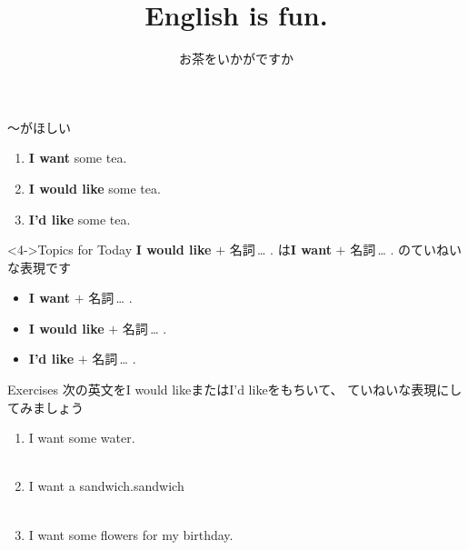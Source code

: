 \documentclass[aspectratio=169,xcolor={dvipsnames,table}]{beamer}
\title{English is fun.}
\subtitle{お茶をいかがですか}
\author{}
\institute[]{}
\date[]
\begin{document}
\begin{frame}[plain]
  \titlepage
\end{frame}


\begin{frame}[plain]{～がほしい}
\large
 \begin{enumerate}
  \item<1-> \textbf{I want} some tea.
  \item<2-> \textbf{I would like} some tea.
  \item<3-> {\bfseries I'd like} some tea.
 \end{enumerate}

\begin{block}<4->{Topics for Today}\small
\textbf{I would like} $+$ 名詞\,\ldots\,\,.\,\,は\textbf{I want} $+$ 名詞\,\ldots\,\,.\,\,のていねいな表現です
\begin{itemize}[square]\small
 \item \textbf{I want} $+$ 名詞\,\ldots\,\,.
 \item \textbf{I would like} $+$ 名詞\,\ldots\,\,.
 \item \textbf{I'd like} $+$ 名詞\,\ldots\,\,.
       \end{itemize}
\end{block}

\hfill{\scriptsize {}}
\end{frame}
\begin{frame}[plain]{Exercises}
次の英文をI would likeまたはI'd likeをもちいて、 ていねいな表現にしてみましょう
 \begin{enumerate}
  \item I want some water.\\
\\
  \item I want a sandwich.\hfill{\scriptsize sandwich }\\
\\
  \item I want some flowers for my birthday.\\
\\
 \end{enumerate}

\hfill{\scriptsize {}}

\end{frame}
\end{document}
